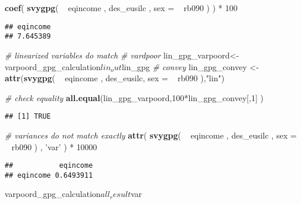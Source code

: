 \documentclass[]{book}
\newenvironment{Shaded}{\begin{snugshade}}{\end{snugshade}}
\newcommand{\KeywordTok}[1]{\textcolor[rgb]{0.13,0.29,0.53}{\textbf{{#1}}}}
\newcommand{\DataTypeTok}[1]{\textcolor[rgb]{0.13,0.29,0.53}{{#1}}}
\newcommand{\DecValTok}[1]{\textcolor[rgb]{0.00,0.00,0.81}{{#1}}}
\newcommand{\StringTok}[1]{\textcolor[rgb]{0.31,0.60,0.02}{{#1}}}
\newcommand{\CommentTok}[1]{\textcolor[rgb]{0.56,0.35,0.01}{\textit{{#1}}}}
\newcommand{\NormalTok}[1]{{#1}}
\begin{document}
\begin{Shaded}
\begin{Highlighting}[]
\KeywordTok{coef}\NormalTok{( }\KeywordTok{svygpg}\NormalTok{( ~}\StringTok{ }\NormalTok{eqincome , des_eusilc , }\DataTypeTok{sex =} \NormalTok{~}\StringTok{ }\NormalTok{rb090 ) ) *}\StringTok{ }\DecValTok{100}
\end{Highlighting}
\end{Shaded}

\begin{verbatim}
## eqincome 
## 7.645389
\end{verbatim}

\begin{Shaded}
\begin{Highlighting}[]
\CommentTok{# linearized variables do match}
\CommentTok{# vardpoor}
\NormalTok{lin_gpg_varpoord<-}\StringTok{ }\NormalTok{varpoord_gpg_calculation$lin_out$lin_gpg}
\CommentTok{# convey }
\NormalTok{lin_gpg_convey <-}\StringTok{ }\KeywordTok{attr}\NormalTok{(}\KeywordTok{svygpg}\NormalTok{( ~}\StringTok{ }\NormalTok{eqincome , des_eusilc, }\DataTypeTok{sex =} \NormalTok{~}\StringTok{ }\NormalTok{rb090 ),}\StringTok{"lin"}\NormalTok{)}

\CommentTok{# check equality}
\KeywordTok{all.equal}\NormalTok{(lin_gpg_varpoord,}\DecValTok{100}\NormalTok{*lin_gpg_convey[,}\DecValTok{1}\NormalTok{] )}
\end{Highlighting}
\end{Shaded}

\begin{verbatim}
## [1] TRUE
\end{verbatim}

\begin{Shaded}
\begin{Highlighting}[]
\CommentTok{# variances do not match exactly}
\KeywordTok{attr}\NormalTok{( }\KeywordTok{svygpg}\NormalTok{( ~}\StringTok{ }\NormalTok{eqincome , des_eusilc , }\DataTypeTok{sex =} \NormalTok{~}\StringTok{ }\NormalTok{rb090 ) , }\StringTok{'var'} \NormalTok{) *}\StringTok{ }\DecValTok{10000}
\end{Highlighting}
\end{Shaded}

\begin{verbatim}
##           eqincome
## eqincome 0.6493911
\end{verbatim}

\begin{Shaded}
\begin{Highlighting}[]
\NormalTok{varpoord_gpg_calculation$all_result$var}
\end{Highlighting}
\end{Shaded}
\end{document}

